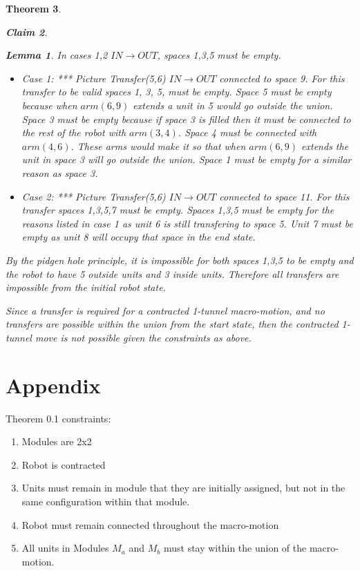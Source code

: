 \documentclass[12pt]{article}
\newtheorem{theorem}{Theorem}[section]
\newtheorem{claim}[theorem]{Claim}
\newtheorem{lemma}[theorem]{Lemma}
\newenvironment{proof}[1][Proof]{\begin{trivlist}
\item[\hskip \labelsep {\bfseries #1}]}{\end{trivlist}}
\begin{document}
\begin{theorem}
\begin{claim}
\begin{lemma}
In cases 1,2 $IN \rightarrow OUT$, spaces 1,3,5 must be empty.
\end{lemma}
\begin{proof}
\begin{itemize}
\item Case 1: *** Picture Transfer(5,6) $IN \rightarrow OUT$ connected to space 9. For this transfer to be valid spaces 1, 3, 5, must be empty. Space 5 must be empty because when $arm(6,9)$ extends a unit in 5 would go outside the union. Space 3 must be empty because if space 3 is filled then it must be connected to the rest of the robot with $arm(3,4)$. Space 4 must be connected with $arm(4,6)$. These arms would make it so that when $arm(6,9)$ extends the unit in space 3 will go outside the union. Space 1 must be empty for a similar reason as space 3.
\item Case 2: *** Picture Transfer(5,6) $IN \rightarrow OUT$ connected to space 11. For this transfer spaces 1,3,5,7 must be empty. Spaces 1,3,5 must be empty for the reasons listed in case 1 as unit 6 is still transfering to space 5. Unit 7 must be empty as unit 8 will occupy that space in the end state. 
\end{itemize}
\end{proof}
By the pidgen hole principle, it is impossible for both spaces 1,3,5 to be empty and the robot to have 5 outside units and 3 inside units. Therefore all transfers are impossible from the initial robot state. 
\end{claim}
Since a transfer is required for a contracted 1-tunnel macro-motion, and no transfers are possible within the union from the start state, then the contracted 1-tunnel move is not possible given the constraints as above. 
\end{theorem}

\section{Appendix}
Theorem 0.1 constraints:
\begin{enumerate}
\item Modules are 2x2
\item Robot is contracted
\item Units must remain in module that they are initially assigned, but not in the same configuration within that module.
\item Robot must remain connected throughout the macro-motion
\item All units in Modules $M_a$ and $M_b$ must stay within the union of the macro-motion.
\end{enumerate}
\end{document}
